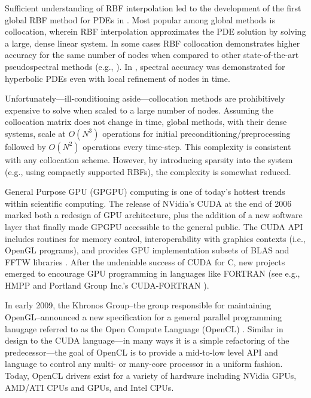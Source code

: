 Sufficient understanding of RBF interpolation led to the development of the first global RBF method for PDEs in \cite{Kansa1990a}. Most popular among global methods is collocation, wherein RBF interpolation approximates the PDE solution by solving a large, dense linear system. 
In some cases RBF collocation demonstrates higher accuracy for the same number of nodes when compared to other state-of-the-art pseudospectral methods (e.g., \cite{Larsson2003} \cite{Flyer2007} \cite{Flyer2009b}). In \cite{Flyer2010}, spectral accuracy was demonstrated for hyperbolic PDEs even with local refinement of nodes in time.


Unfortunately---ill-conditioning aside---collocation methods are prohibitively expensive to solve when scaled to a large number of nodes. Assuming the collocation matrix does not change in time, global methods, with their dense systems, scale at $O(N^3)$ operations for initial preconditioning/preprocessing followed by $O(N^2)$ operations every time-step. This complexity is consistent with any collocation scheme. However, by introducing sparsity into the system (e.g., using compactly supported RBFs), the complexity is somewhat reduced.



General Purpose GPU (GPGPU) computing is one of today's hottest trends within scientific computing. 
The release of NVidia's CUDA at the end of 2006 marked both a 
redesign of GPU architecture, plus the addition of a new software layer that finally made GPGPU accessible to the general public. The CUDA API includes routines for memory control, interoperability with graphics contexts (i.e., 
OpenGL programs), and provides GPU implementation subsets of BLAS and FFTW libraries \cite{CudaGuide2011}. After the undeniable success of CUDA for C, new projects emerged to encourage GPU programming in languages like FORTRAN (see e.g., HMPP \cite{HMPP2009} and Portland Group Inc.'s CUDA-FORTRAN \cite{CudaFortran2009}). 

In early 2009, the Khronos Group--the group responsible for maintaining OpenGL--announced a new specification for a general 
parallel programming lanugage referred to as the Open Compute Language (OpenCL) \cite{OpenCL2009}. Similar in design to the CUDA language---in many ways it is a simple refactoring of the predecessor---the goal of OpenCL is to provide a mid-to-low level API and language to control any multi- or many-core processor in a uniform fashion. Today, OpenCL drivers exist for a variety of hardware including NVidia GPUs, AMD/ATI CPUs and GPUs, and Intel CPUs. 

